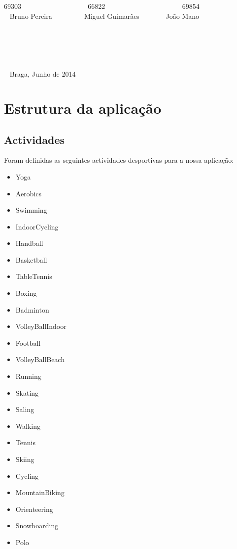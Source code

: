 \documentclass[12pt,notitlepage]{article}
\begin{document}
\begin{titlepage}
\begin{center}
69303 ~~~~~~~~~~~~~~~~~~ 66822 ~~~~~~~~~~~~~~~~~~~~~ 69854   \\~ Bruno Pereira  ~~~~~~~~ Miguel Guimarães ~~~~~~~João Mano  \\~ \\~ \\~ \\~ \\~ \\~ Braga, Junho de 2014
\end{center}
\end{titlepage}




\tableofcontents
\newpage
\listoffigures
\newpage


\section{Estrutura da aplicação}

\subsection{Actividades}
Foram definidas as seguintes actividades desportivas para a nossa aplicação:
\begin{multicols}{2}
\begin{itemize}
\item Yoga
\item Aerobics
\item Swimming
\item IndoorCycling
\item Handball
\item Basketball
\item TableTennis
\item Boxing
\item Badminton
\item VolleyBallIndoor
\item Football
\item VolleyBallBeach
\item Running
\item Skating
\item Saling
\item Walking
\item Tennis
\item Skiing
\item Cycling
\item MountainBiking
\item Orienteering
\item Snowboarding
\item Polo
\end{itemize}
\end{multicols}
\end{document}
